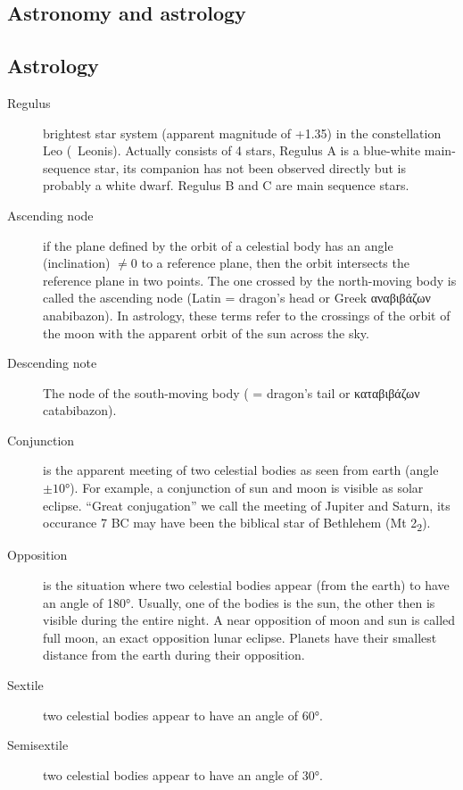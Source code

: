\documentclass[notitlepage,british]{scrartcl}
\begin{document}
\begin{refsection}
\section{Astronomy and astrology}

\subsection{Astrology}

\begin{description}
  \item[Regulus]{brightest star system (apparent magnitude of +1.35) in the constellation Leo (\textalpha\ Leonis). Actually consists of 4 stars, Regulus A is a blue-white main-sequence star, its companion has not been observed directly but is probably a white dwarf. Regulus B and C are main sequence stars.}
  \item[Ascending node]{if the plane defined by the orbit of a celestial body has an angle (inclination) \(\neq 0\) to a reference plane, then the orbit intersects the reference plane in two points. The one crossed by the north-moving body is called the ascending node (Latin  = dragon's head or Greek \foreignlanguage{greek}{αναβιβάζων} anabibazon). In astrology, these terms refer to the crossings of the orbit of the moon with the apparent orbit of the sun across the sky.}
  \item[Descending note]{The node of the south-moving body ( = dragon's tail or \foreignlanguage{greek}{καταβιβάζων} catabibazon). }
  \item[Conjunction]{is the apparent meeting of two celestial bodies as seen from earth (angle \(\pm 10°\)). For example, a conjunction of sun and moon is visible as solar eclipse. ``Great conjugation'' we call the meeting of Jupiter and Saturn, its occurance \num{7} BC may have been the biblical star of Bethlehem (Mt 2\textsubscript{2}).}
  \item[Opposition]{is the situation where two celestial bodies appear (from the earth) to have an angle of \ang{180}. Usually, one of the bodies is the sun, the other then is visible during the entire night. A near opposition of moon and sun is called full moon, an exact opposition lunar eclipse. Planets have their smallest distance from the earth during their opposition.  }
  \item[Sextile]{two celestial bodies appear to have an angle of \ang{60}.}
  \item[Semisextile]{two celestial bodies appear to have an angle of \ang{30}.}

\end{description}
\end{refsection}
\end{document}
